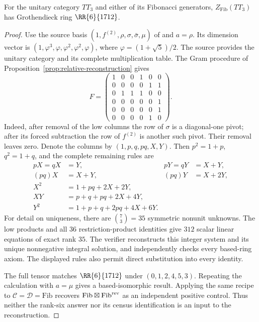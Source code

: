 \begin{corollary}\label{cor:tt3-relative}
For the unitary category $TT_3$ and either of its Fibonacci generators,
$Z_{\mathrm{Fib}}(TT_3)$ has Grothendieck ring $\RR{6}{1712}$.
\end{corollary}
\begin{proof}
Use the source basis $(1,f^{(2)},\rho,\sigma,\bar\sigma,\mu)$ of
\cite[Definition~2.5]{EM} and $a=\rho$. Its dimension vector is
$(1,\varphi^3,\varphi,\varphi^2,\varphi^2,\varphi)$,
where $\varphi=(1+\sqrt5)/2$. The source provides the unitary category and
its complete multiplication table. The Gram procedure of
Proposition~\ref{prop:relative-reconstruction} gives
\[
 F=\begin{pmatrix}
 1&0&0&1&0&0\\
 0&0&0&0&1&1\\
 0&1&1&1&0&0\\
 0&0&0&0&0&1\\
 0&0&0&0&0&1\\
 0&0&0&0&1&0
 \end{pmatrix}.
\]
Indeed, after removal of the low columns the row of $\sigma$ is a
diagonal-one pivot; after its forced subtraction the row of $f^{(2)}$
is another such pivot. Their removal leaves zero. Denote the columns by
$(1,p,q,pq,X,Y)$. Then $p^2=1+p$, $q^2=1+q$, and the complete remaining
rules are
\begin{align*}
 pX=qX&=Y,&pY=qY&=X+Y,\\
 (pq)X&=X+Y,&(pq)Y&=X+2Y,\\
 X^2&=1+pq+2X+2Y,\\
 XY&=p+q+pq+2X+4Y,\\
 Y^2&=1+p+q+2pq+4X+6Y.
\end{align*}
For detail on uniqueness, there are $\binom{7}{3}=35$ symmetric nonunit
unknowns. The low products and all $36$ restriction-product identities
give $312$ scalar linear equations of exact rank $35$. The verifier
reconstructs this integer system and its unique nonnegative integral
solution, and independently checks every based-ring axiom. The displayed
rules also permit direct substitution into every identity.

The full tensor matches $\RR{6}{1712}$ under $(0,1,2,4,5,3)$.
Repeating the calculation with $a=\mu$ gives a based-isomorphic result.
Applying the same recipe to $\mathcal C=\mathcal D=\mathrm{Fib}$ recovers
$\mathrm{Fib}\boxtimes\mathrm{Fib}^{\rm rev}$ as an independent positive
control. Thus neither the rank-six answer nor its census identification
is an input to the reconstruction.
\end{proof}



